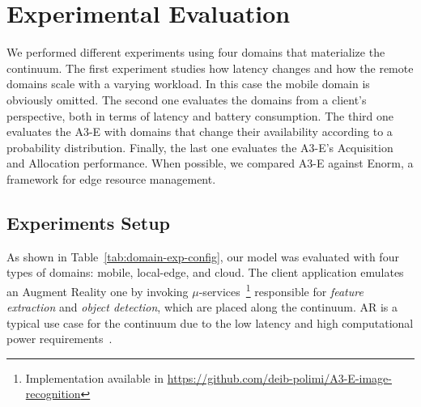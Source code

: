
\section{Experimental Evaluation}\label{sec:evaluation}

We performed different experiments using four domains that materialize the continuum. 
The first experiment studies how latency changes and how the remote domains scale with a varying workload. 
In this case the mobile domain is obviously omitted. The second one evaluates the domains from a client's perspective, both in terms of latency and battery consumption. The third one evaluates the A3-E with domains that change their availability according to a probability distribution. Finally, the last one evaluates the A3-E's Acquisition and Allocation performance. When possible, we compared A3-E against Enorm, a framework for edge resource management.

\subsection{Experiments Setup}


As shown in Table~\ref{tab:domain-exp-config}, our model was evaluated with four types of domains: mobile, local-edge, and cloud. The client application emulates an Augment Reality one by invoking
$\mu$-services~\footnote{Implementation available in \url{https://github.com/deib-polimi/A3-E-image-recognition}} responsible for \textit{feature extraction} and \textit{object detection}, which are placed along the continuum. AR is a typical use case for the continuum due to the low latency and high computational power requirements~\cite{beck2014mobile}.

